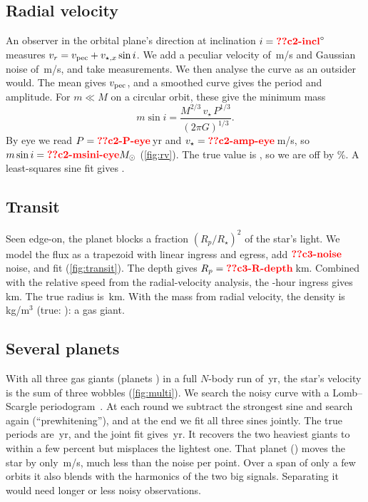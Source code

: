 \documentclass[aps,prd,twocolumn,nofootinbib,floatfix,superscriptaddress]{revtex4-2}
\begin{document}
\subsection{Radial velocity}
An observer in the orbital plane's direction at inclination $i=\val{c2-incl}^\circ$ measures $v_r=v_{\rm pec}+v_{\star,x}\sin i$.
We add a peculiar velocity of \,m/s and Gaussian noise of \,m/s, and take  measurements.
We then analyse the curve as an outsider would.
The mean gives $v_{\rm pec}$, and a smoothed curve gives the period and amplitude.
For $m\ll M$ on a circular orbit, these give the minimum mass
\begin{equation}
  m\sin i = \frac{M^{2/3}\,v_\star\,P^{1/3}}{(2\pi G)^{1/3}}.
\end{equation}
By eye we read $P=\val{c2-P-eye}$\,yr and $v_\star=\val{c2-amp-eye}$\,m/s, so $m\sin i=\val{c2-msini-eye}\Msun$ (\cref{fig:rv}).
The true value is , so we are off by \%.
A least-squares sine fit gives .

\subsection{Transit}
Seen edge-on, the planet blocks a fraction $(R_p/R_\star)^2$ of the star's light.
We model the flux as a trapezoid with linear ingress and egress, add $\val{c3-noise}$ noise, and fit (\cref{fig:transit}).
The depth  gives $R_p=\val{c3-R-depth}$\,km.
Combined with the relative speed from the radial-velocity analysis, the -hour ingress gives \,km.
The true radius is \,km.
With the mass from radial velocity, the density is \,kg/m$^3$ (true: ): a gas giant.

\subsection{Several planets}
With all three gas giants (planets ) in a full $N$-body run of \,yr, the star's velocity is the sum of three wobbles (\cref{fig:multi}).
We search the noisy curve with a Lomb--Scargle periodogram~\cite{lomb1976}.
At each round we subtract the strongest sine and search again (``prewhitening''), and at the end we fit all three sines jointly.
The true periods are \,yr, and the joint fit gives \,yr.
It recovers the two heaviest giants to within a few percent but misplaces the lightest one.
That planet () moves the star by only \,m/s, much less than the noise per point.
Over a span of only a few orbits it also blends with the harmonics of the two big signals.
Separating it would need longer or less noisy observations.
\end{document}
